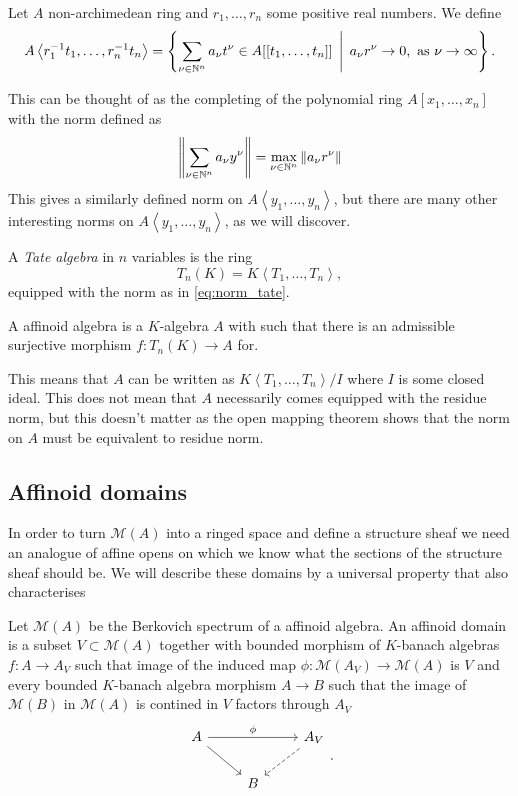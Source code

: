 \begin{definition}
	Let $A$ non-archimedean ring and $r_1, \ldots, r_n$ some positive real numbers. We define \[
		A \left<r_1^{-1}t_1, \ldots, r_{n}^{-1} t_n \right> = \left\{\sum_{\nu \in \N^{n}}^{} a_\nu t^{\nu} \in A[[t_1,\ldots, t_n]]\st a_\nu r^{\nu} \to 0, \text{ as } \nu \to \infty\right\} 
	.\] 
\end{definition}
This can be thought of as the completing of the polynomial ring $A[x_1, \ldots, x_n]$ with the norm defined as 
\begin{equation}\label{eq:norm_tate}
	\left\| \sum_{\nu \in \mathbb{N}^{n}} a_\nu y^{\nu}\right\| = \max_{\nu \in \mathbb{N}^{n}} \|a_\nu r^{\nu}\|
\end{equation}
This gives a similarly defined norm on $A\left<y_1, \ldots, y_n \right>$, but there are many other interesting norms on $A \left<y_1, \ldots, y_n \right>$, as we will discover. 

\begin{definition}
	A \emph{Tate algebra} in $n$ variables is the ring \[
		T_n(K) = K\left<T_1, \ldots, T_n \right>
	,\]
	equipped with the norm as in \eqref{eq:norm_tate}.
\end{definition}


\begin{definition}
	A affinoid algebra is a $K$-algebra $A$ with such that there is an admissible surjective morphism $f: T_n(K) \to A$ for. 
\end{definition}
This means that $A$ can be written as $K\left<T_1, \ldots, T_n \right> / I$ where $I$ is some closed ideal.
This does not mean that $A$ necessarily comes equipped with the residue norm, but this doesn't matter as the open mapping theorem shows that the norm on $A$ must be equivalent to residue norm.

\subsection{Affinoid domains} \label{sec:affinoid_domains}

In order to turn $\mathcal{M} (A)$ into a ringed space and define a structure sheaf we need an analogue of affine opens on which we know what the sections of the structure sheaf should be. 
We will describe these domains by a universal property that also characterises 

\begin{definition}
	Let $\mathcal{M} (A)$ be the Berkovich spectrum of a affinoid algebra. 
	An affinoid domain is a subset $V \subset  \mathcal{M} (A)$ together with bounded morphism of $K$-banach algebras $f:A \to A_V$ such that image of the induced map $\phi:\mathcal{M} (A_V) \to \mathcal{M} (A)$ is $V$ and every bounded $K$-banach algebra morphism $A \to B$ such that the image of $\mathcal{M} (B)$ in $\mathcal{M} (A)$ is contined in $V$ factors through $A_V$ \[
	\begin{tikzcd}
		A \ar{rr}{\phi} \ar{dr}& & A_V \ar[dashed]{dl} \\
				& B
	\end{tikzcd}
	.\] 
\end{definition}


